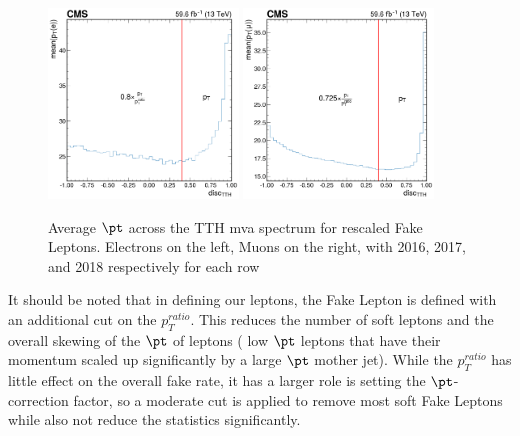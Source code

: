 \begin{figure}
  \includegraphics[width=0.45\textwidth]{cone_correction/corrected_Electron_0p4_2018.png} \hfill
  \includegraphics[width=0.45\textwidth]{cone_correction/corrected_Muon_0p4_2018.png} \\
  \caption{Average $\pt$ across the TTH mva spectrum for rescaled Fake Leptons. Electrons on the left, Muons on the right, with 2016, 2017, and 2018 respectively for each row}\label{fig:corrected_pt}
\end{figure}

It should be noted that in defining our leptons, the Fake Lepton is defined with an additional cut on the $p_{T}^{ratio}$. This reduces the number of soft leptons and the overall skewing of the $\pt$ of leptons (\ie{} low $\pt$ leptons that have their momentum scaled up significantly by a large $\pt$ mother jet). While the $p_{T}^{ratio}$ has little effect on the overall fake rate, it has a larger role is setting the $\pt$-correction factor, so a moderate cut is applied to remove most soft Fake Leptons while also not reduce the statistics significantly.

